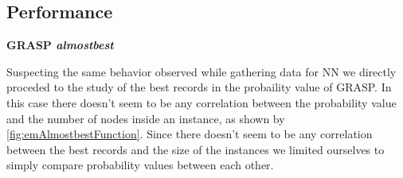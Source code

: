 

\subsection{Performance}

\textbf{GRASP \textit{almostbest}}

Suspecting the same behavior observed while gathering data for NN we directly proceded to the study of the best records in the probaility value of GRASP.
In this case there doesn't seem to be any correlation between the probability value and the number of nodes inside an instance, as shown by \figurename{ \ref{fig:emAlmostbestFunction}}.
Since there doesn't seem to be any correlation between the best records and the size of the instances we limited ourselves to simply compare probability values between each other.

